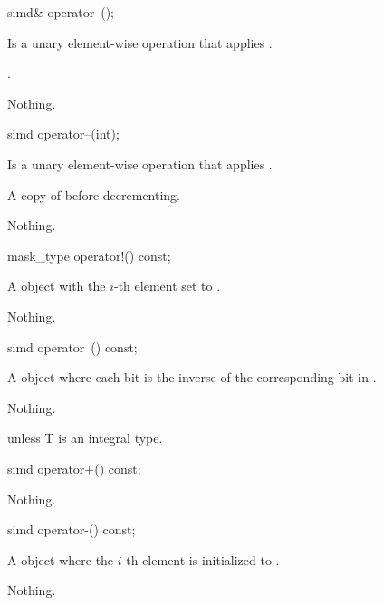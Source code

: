 \begin{itemdecl}
simd& operator--();
\end{itemdecl}
\begin{itemdescr}
  \pnum\effects Is a unary element-wise operation that applies .

  \pnum\returns {}.

  \pnum\throws Nothing.
\end{itemdescr}

\begin{itemdecl}
simd operator--(int);
\end{itemdecl}
\begin{itemdescr}
  \pnum\effects Is a unary element-wise operation that applies .

  \pnum\returns A copy of  before decrementing.

  \pnum\throws Nothing.
\end{itemdescr}

\begin{itemdecl}
mask_type operator!() const;
\end{itemdecl}
\begin{itemdescr}
  \pnum\returns A \mask object with the $i$-th element set to  \foralli.

  \pnum\throws Nothing.
\end{itemdescr}

\begin{itemdecl}
simd operator~() const;
\end{itemdecl}
\begin{itemdescr}
  \pnum\returns A \simd object where each bit is the inverse of the corresponding bit in .

  \pnum\throws Nothing.

  \pnum\remarks \simd{} \specialsfinae unless \type T is an integral type.
\end{itemdescr}

\begin{itemdecl}
simd operator+() const;
\end{itemdecl}
\begin{itemdescr}
  \pnum\returns {}

  \pnum\throws Nothing.
\end{itemdescr}

\begin{itemdecl}
simd operator-() const;
\end{itemdecl}
\begin{itemdescr}
  \pnum\returns A \simd object where the $i$-th element is initialized to  \foralli.

  \pnum\throws Nothing.
\end{itemdescr}

